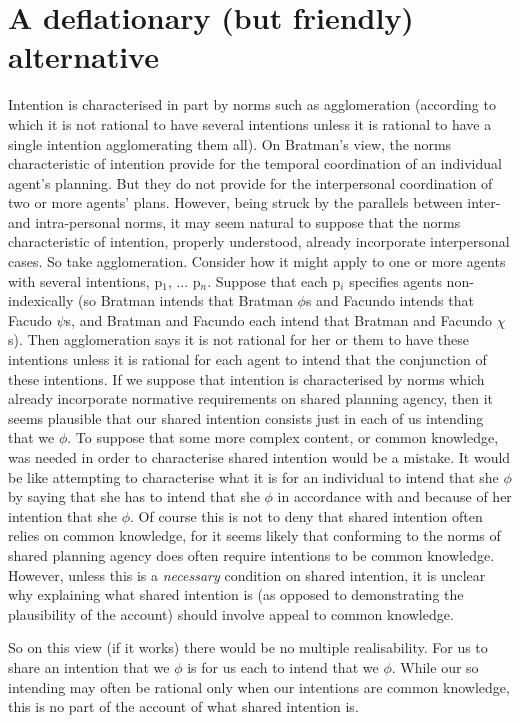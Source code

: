 \documentclass[12pt,letterpaper]{extarticle}
\begin{document}
\section{A deflationary (but friendly) alternative}
Intention is characterised in part by norms such as agglomeration (according to which it is not rational to have several intentions unless it is rational to have a single intention agglomerating them all).
On Bratman's view, the norms characteristic of intention provide for the temporal coordination of an individual agent's planning.
But they do not provide for the interpersonal coordination of two or more agents' plans.
However, being struck by the parallels between inter- and intra-personal norms, it may seem natural to suppose that the norms characteristic of intention, properly understood, already incorporate interpersonal cases.
So take agglomeration.
Consider how it might apply to one or more agents with several intentions, p$_1$, ... p$_n$.
Suppose that each p$_i$ specifies agents non-indexically (so Bratman intends that Bratman $\phi$s and Facundo intends that Facudo $\psi$s, and Bratman and Facundo each intend that Bratman and Facundo $\chi$s).
Then agglomeration says it is not rational for her or them to have these intentions unless it is rational for each agent to intend that the conjunction of these intentions.  
If we suppose that intention is characterised by norms which already incorporate normative requirements on shared planning agency, then it seems plausible that our shared intention consists just in each of us intending that we $\phi$.
To suppose that some more complex content, or common knowledge, was needed in order to characterise shared intention would be a mistake.
It would be like attempting to characterise what it is for an individual to intend that she $\phi$ by saying that she has to intend that she $\phi$ in accordance with and because of her intention that she $\phi$.
Of course this is not to deny that shared intention often relies on common knowledge, for it seems likely that conforming to the norms of shared planning agency does often require intentions to be common knowledge.
However, unless this is a \emph{necessary} condition on shared intention, it is unclear why explaining what shared intention is (as opposed to demonstrating the plausibility of the account) should involve appeal to common knowledge.

So on this view (if it works) there would be no multiple realisability.
For us to share an intention that we $\phi$ is for us each to intend that we $\phi$.
While our so intending may often be rational only when our intentions are common knowledge, this is no part of the account of what shared intention is.



\small

\end{document}
